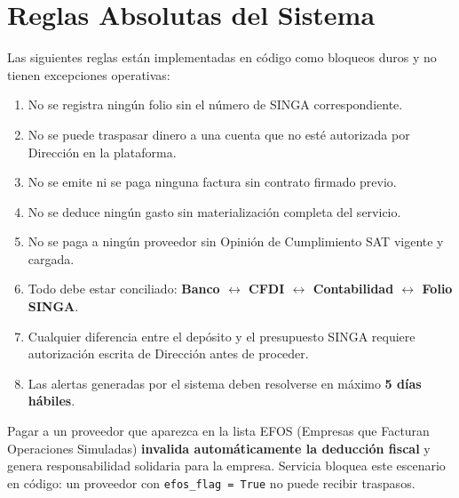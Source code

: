 \documentclass[12pt,a4paper]{article}
\begin{document}
\newpage

\section{Reglas Absolutas del Sistema}

Las siguientes reglas est\'an implementadas en c\'odigo como bloqueos duros y
no tienen excepciones operativas:

\begin{rulebox}
\begin{enumerate}
  \item No se registra ning\'un folio sin el n\'umero de SINGA correspondiente.
  \item No se puede traspasar dinero a una cuenta que no est\'e autorizada por
    Direcci\'on en la plataforma.
  \item No se emite ni se paga ninguna factura sin contrato firmado previo.
  \item No se deduce ning\'un gasto sin materializaci\'on completa del servicio.
  \item No se paga a ning\'un proveedor sin Opini\'on de Cumplimiento SAT
    vigente y cargada.
  \item Todo debe estar conciliado: \textbf{Banco $\leftrightarrow$ CFDI
    $\leftrightarrow$ Contabilidad $\leftrightarrow$ Folio SINGA}.
  \item Cualquier diferencia entre el dep\'osito y el presupuesto SINGA requiere
    autorizaci\'on escrita de Direcci\'on antes de proceder.
  \item Las alertas generadas por el sistema deben resolverse en m\'aximo
    \textbf{5 d\'ias h\'abiles}.
\end{enumerate}
\end{rulebox}

\bigskip

\begin{alertbox}
Pagar a un proveedor que aparezca en la lista EFOS (Empresas que Facturan
Operaciones Simuladas) \textbf{invalida autom\'aticamente la deducci\'on fiscal}
y genera responsabilidad solidaria para la empresa. Servicia bloquea este
escenario en c\'odigo: un proveedor con \texttt{efos\_flag = True} no puede
recibir traspasos.
\end{alertbox}
\end{document}
